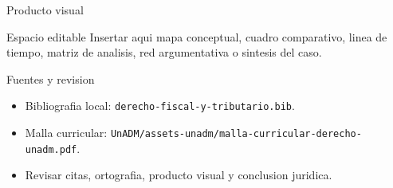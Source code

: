 \documentclass[
  spanish,
  aspectratio=169,
  xcolor={dvipsnames,table}
]{beamer}
\begin{document}
\begin{frame}{Producto visual}
  \begin{block}{Espacio editable}
    Insertar aqui mapa conceptual, cuadro comparativo, linea de tiempo,
    matriz de analisis, red argumentativa o sintesis del caso.
  \end{block}
  \centering
\end{frame}

\begin{frame}{Fuentes y revision}
  \begin{itemize}
    \item Bibliografia local: \texttt{derecho-fiscal-y-tributario.bib}.
    \item Malla curricular: \texttt{UnADM/assets-unadm/malla-curricular-derecho-unadm.pdf}.
    \item Revisar citas, ortografia, producto visual y conclusion juridica.
  \end{itemize}
\end{frame}
\end{document}
